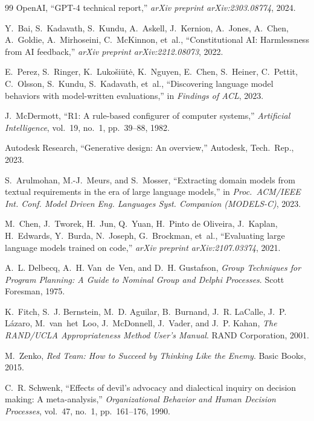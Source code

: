 \documentclass[11pt,a4paper]{article}
\begin{document}
\begin{thebibliography}{99}
OpenAI, ``GPT-4 technical report,'' \emph{arXiv preprint arXiv:2303.08774}, 2024.

Y.~Bai, S.~Kadavath, S.~Kundu, A.~Askell, J.~Kernion, A.~Jones, A.~Chen, A.~Goldie, A.~Mirhoseini, C.~McKinnon, et~al., ``Constitutional AI: Harmlessness from AI feedback,'' \emph{arXiv preprint arXiv:2212.08073}, 2022.

E.~Perez, S.~Ringer, K.~Luko\v{s}i\={u}t\.{e}, K.~Nguyen, E.~Chen, S.~Heiner, C.~Pettit, C.~Olsson, S.~Kundu, S.~Kadavath, et~al., ``Discovering language model behaviors with model-written evaluations,'' in \emph{Findings of ACL}, 2023.

J.~McDermott, ``R1: A rule-based configurer of computer systems,'' \emph{Artificial Intelligence}, vol.~19, no.~1, pp.~39--88, 1982.

Autodesk Research, ``Generative design: An overview,'' Autodesk, Tech.\ Rep., 2023.

S.~Arulmohan, M.-J.~Meurs, and S.~Mosser, ``Extracting domain models from textual requirements in the era of large language models,'' in \emph{Proc.\ ACM/IEEE Int. Conf. Model Driven Eng. Languages Syst. Companion (MODELS-C)}, 2023.

M.~Chen, J.~Tworek, H.~Jun, Q.~Yuan, H.~Pinto de Oliveira, J.~Kaplan, H.~Edwards, Y.~Burda, N.~Joseph, G.~Brockman, et~al., ``Evaluating large language models trained on code,'' \emph{arXiv preprint arXiv:2107.03374}, 2021.

A.~L. Delbecq, A.~H. Van~de~Ven, and D.~H. Gustafson, \emph{Group Techniques for Program Planning: A Guide to Nominal Group and Delphi Processes}. Scott Foresman, 1975.

K.~Fitch, S.~J. Bernstein, M.~D. Aguilar, B.~Burnand, J.~R. LaCalle, J.~P. L\'{a}zaro, M.~van~het~Loo, J.~McDonnell, J.~Vader, and J.~P. Kahan, \emph{The RAND/UCLA Appropriateness Method User's Manual}. RAND Corporation, 2001.

M.~Zenko, \emph{Red Team: How to Succeed by Thinking Like the Enemy}. Basic Books, 2015.

C.~R. Schwenk, ``Effects of devil's advocacy and dialectical inquiry on decision making: A meta-analysis,'' \emph{Organizational Behavior and Human Decision Processes}, vol.~47, no.~1, pp.~161--176, 1990.


\end{thebibliography}
\end{document}
